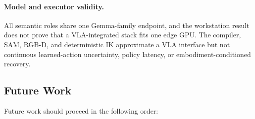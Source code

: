 \documentclass{article}
\begin{document}
\paragraph{Model and executor validity.}
All semantic roles share one Gemma-family endpoint, and the workstation result
does not prove that a VLA-integrated stack fits one edge GPU. The compiler,
SAM, RGB-D, and deterministic IK approximate a VLA interface but not continuous
learned-action uncertainty, policy latency, or embodiment-conditioned recovery.

\subsection{Future Work}
\label{subsec:discussion-future-work}

Future work should proceed in the following order:
\end{document}
